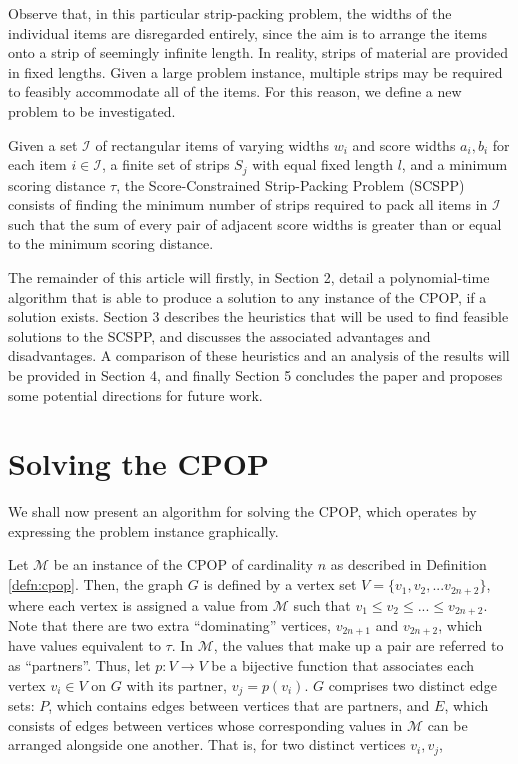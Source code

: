 \documentclass[oribibl]{llncs}
\begin{document}
Observe that, in this particular strip-packing problem, the widths of the individual items are disregarded entirely, since the aim is to arrange the items onto a strip of seemingly infinite length. In reality, strips of material are provided in fixed lengths. Given a large problem instance, multiple strips may be required to feasibly accommodate all of the items. For this reason, we define a new problem to be investigated.

\begin{definition}
	\label{defn:scspp}
	Given a set $\mathcal{I}$ of rectangular items of varying widths $w_i$ and score widths $a_i, b_i$ for each item $i \in \mathcal{I}$, a finite set of strips $S_j$ with equal fixed length $l$, and a minimum scoring distance $\tau$, the Score-Constrained Strip-Packing Problem (SCSPP) consists of finding the minimum number of strips required to pack all items in $\mathcal{I}$ such that the sum of every pair of adjacent score widths is greater than or equal to the minimum scoring distance.
\end{definition}

The remainder of this article will firstly, in Section 2, detail a polynomial-time algorithm that is able to produce a solution to any instance of the CPOP, if a solution exists. Section 3 describes the heuristics that will be used to find feasible solutions to the SCSPP, and discusses the associated advantages and disadvantages. A comparison of these heuristics and an analysis of the results will be provided in Section 4, and finally Section 5 concludes the paper and proposes some potential directions for future work.


\section{Solving the CPOP}
\label{sec:ahca}

We shall now present an algorithm for solving the CPOP, which operates by expressing the problem instance graphically. 

Let $\mathcal{M}$ be an instance of the CPOP of cardinality $n$ as described in Definition \ref{defn:cpop}. Then, the graph $G$ is defined by a vertex set $V = \{v_1, v_2, ...v_{2n+2}\}$, where each vertex is assigned a value from $\mathcal{M}$ such that $v_1 \leq v_2 \leq ... \leq v_{2n+2}$. Note that there are two extra ``dominating'' vertices, $v_{2n+1}$ and $v_{2n+2}$, which have values equivalent to $\tau$. In $\mathcal{M}$, the values that make up a pair are referred to as ``partners''. Thus, let $p: V \to V$ be a bijective function that associates each vertex $v_i \in V$ on $G$ with its partner, $v_j = p(v_i)$. $G$ comprises two distinct edge sets: $P$, which contains edges between vertices that are partners, and $E$, which consists of edges between vertices whose corresponding values in $\mathcal{M}$ can be arranged alongside one another. That is, for two distinct vertices $v_i, v_j$,
\end{document}

